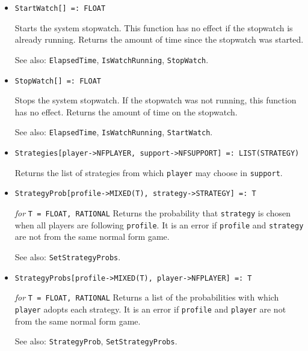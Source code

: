 \begin{itemize}
\item{}
\protect \large \begin{verbatim}
StartWatch[] =: FLOAT
\end{verbatim}\normalsize

\bd
Starts the system stopwatch.  This function has no
effect if the stopwatch is already running.
Returns the amount of time since the stopwatch was started.
\item [See also:] \verb+ElapsedTime+, \verb+IsWatchRunning+, \verb+StopWatch+.
\ed

\item{}
\protect \large \begin{verbatim}
StopWatch[] =: FLOAT
\end{verbatim}\normalsize

\bd
Stops the system stopwatch.  If the stopwatch was not
running, this function has no effect.  Returns the amount of time
on the stopwatch.
\item [See also:] \verb+ElapsedTime+, \verb+IsWatchRunning+,
\verb+StartWatch+.
\ed

\item{}
\protect \large \begin{verbatim}
Strategies[player->NFPLAYER, support->NFSUPPORT] =: LIST(STRATEGY)
\end{verbatim}\normalsize

\bd
Returns the list of strategies from which  \verb+player+ may choose
in \verb+support+.
\ed

\item{}
\protect \large \begin{verbatim}
StrategyProb[profile->MIXED(T), strategy->STRATEGY] =: T
\end{verbatim} \normalsize

{\it for} {\tt T = FLOAT, RATIONAL}
\bd
Returns the probability that \verb+strategy+ is chosen when all
players are following \verb+profile+.  It is an error if \verb+profile+
and \verb+strategy+ are not from the same normal form game.
\item [See also:] \verb+SetStrategyProbs+.
\ed

\item{}
\protect \large \begin{verbatim}
StrategyProbs[profile->MIXED(T), player->NFPLAYER] =: T
\end{verbatim} \normalsize

{\it for} {\tt T = FLOAT, RATIONAL}
\bd
Returns a list of the probabilities with which \verb+player+ adopts
each strategy.  It is an error if \verb+profile+
and \verb+player+ are not from the same normal form game.
\item [See also:] \verb+StrategyProb+, \verb+SetStrategyProbs+.
\ed


\end{itemize}
